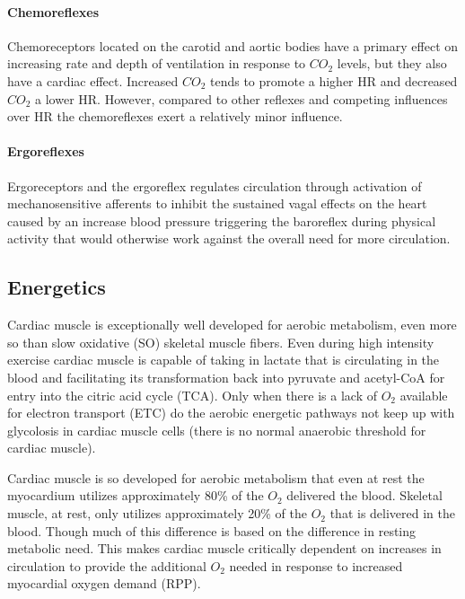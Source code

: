 \paragraph{Chemoreflexes}
Chemoreceptors located on the carotid and aortic bodies have a primary effect on increasing rate and depth of ventilation in response to $CO_2$ levels, but they also have a cardiac effect. Increased $CO_2$ tends to promote a higher HR and decreased $CO_2$ a lower HR. However, compared to other reflexes and competing influences over HR the chemoreflexes exert a relatively minor influence.

\paragraph{Ergoreflexes}
Ergoreceptors and the ergoreflex regulates circulation through activation of mechanosensitive afferents to inhibit the sustained vagal effects on the heart caused by an increase blood pressure triggering the baroreflex during physical activity that would otherwise work against the overall need for more circulation.


\subsection{Energetics}

Cardiac muscle is exceptionally well developed for aerobic metabolism, even more so than slow oxidative (SO) skeletal muscle fibers. Even during high intensity exercise cardiac muscle is capable of taking in lactate that is circulating in the blood and facilitating its transformation back into pyruvate and acetyl-CoA for entry into the citric acid cycle (TCA). Only when there is a lack of $O_2$ available for electron transport (ETC) do the aerobic energetic pathways not keep up with glycolosis in cardiac muscle cells (there is no normal anaerobic threshold for cardiac muscle). 

Cardiac muscle is so developed for aerobic metabolism that even at rest the myocardium utilizes approximately 80\% of the $O_2$ delivered the blood. Skeletal muscle, at rest, only utilizes approximately 20\% of the $O_2$ that is delivered in the blood. Though much of this difference is based on the difference in resting metabolic need. This makes cardiac muscle critically dependent on increases in circulation to provide the additional $O_2$ needed in response to increased myocardial oxygen demand (RPP).

